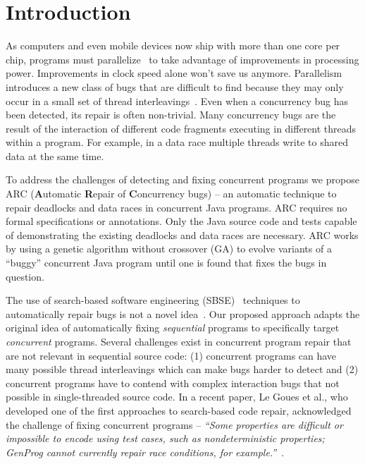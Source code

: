  \section{Introduction}
\label{sec:introduction}

As computers and even mobile devices now ship with more than one core per chip, programs must parallelize~\cite{SL05} to take advantage of improvements in processing power. Improvements in clock speed alone won't save us anymore. Parallelism introduces a new class of bugs that are difficult to find because they may only occur in a small set of thread interleavings~\cite{MQB07}. Even when a concurrency bug has been detected, its repair is often non-trivial. Many concurrency bugs are the result of the interaction of different code fragments executing in different threads within a program. For example, in a data race multiple threads write to shared data at the same time.

To address the challenges of detecting and fixing concurrent programs we propose ARC (\textbf{A}utomatic \textbf{R}epair of \textbf{C}oncurrency bugs) -- an automatic technique to repair deadlocks and data races in concurrent Java programs. ARC requires no formal specifications or annotations. Only the Java source code and tests capable of demonstrating the existing deadlocks and data races are necessary. ARC works by using a genetic algorithm without crossover (GA\negC) to evolve variants of a ``buggy'' concurrent Java program until one is found that fixes the bugs in question.

The use of search-based software engineering (SBSE)~\cite{Har+10} techniques to automatically repair bugs is not a novel idea~\cite{FNWG09, WNLF09, NWLF09, WFGN10, GNFW11, LDFW12}. Our proposed approach adapts the original idea of automatically fixing \textit{sequential} programs to specifically target \textit{concurrent} programs. Several challenges exist in concurrent program repair  that are not relevant in sequential source code: (1) concurrent programs can have many possible thread interleavings which can make bugs harder to detect and (2) concurrent programs have to contend with complex interaction bugs that not possible in single-threaded source code. In a recent paper, Le Goues et al., who developed one of the first approaches to search-based code repair, acknowledged the challenge of fixing concurrent programs -- \textit{``Some properties are difficult or impossible to encode using test cases, such as nondeterministic properties; GenProg cannot currently repair race conditions, for example.''}~\cite{GNFW11}.

